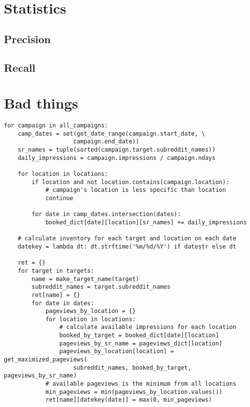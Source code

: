 \documentclass[11pt, a4paper]{article}
\begin{document}
\section{Statistics}

\subsection*{Precision}


\subsection*{Recall}


\section{Bad things}

\hrulefill
\begin{lstlisting}[caption=3-for-loops power]
for campaign in all_campaigns:
    camp_dates = set(get_date_range(campaign.start_date, \
					campaign.end_date))
    sr_names = tuple(sorted(campaign.target.subreddit_names))
    daily_impressions = campaign.impressions / campaign.ndays

    for location in locations:
        if location and not location.contains(campaign.location):
            # campaign's location is less specific than location
            continue

        for date in camp_dates.intersection(dates):
            booked_dict[date][location][sr_names] += daily_impressions

    # calculate inventory for each target and location on each date
    datekey = lambda dt: dt.strftime('%m/%d/%Y') if datestr else dt

    ret = {}
    for target in targets:
        name = make_target_name(target)
        subreddit_names = target.subreddit_names
        ret[name] = {}
        for date in dates:
            pageviews_by_location = {}
            for location in locations:
                # calculate available impressions for each location
                booked_by_target = booked_dict[date][location]
                pageviews_by_sr_name = pageviews_dict[location]
                pageviews_by_location[location] = get_maximized_pageviews(
                    subreddit_names, booked_by_target, pageviews_by_sr_name)
            # available pageviews is the minimum from all locations
            min_pageviews = min(pageviews_by_location.values())
            ret[name][datekey(date)] = max(0, min_pageviews)
\end{lstlisting}
\hrulefill
\hrulefill
\end{document}

